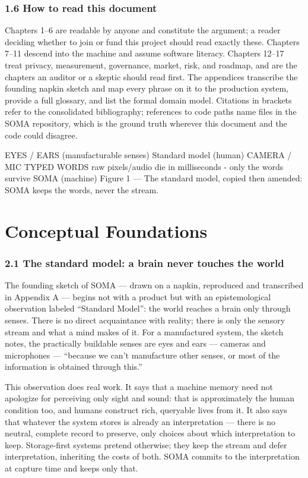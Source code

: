 \subsection{1.6 How to read this document}\label{how-to-read-this-document}

Chapters 1--6 are readable by anyone and constitute the argument; a reader deciding whether to join or fund this project should read exactly these. Chapters 7--11 descend into the machine and assume software literacy. Chapters 12--17 treat privacy, measurement, governance, market, risk, and roadmap, and are the chapters an auditor or a skeptic should read first. The appendices transcribe the founding napkin sketch and map every phrase on it to the production system, provide a full glossary, and list the formal domain model. Citations in brackets refer to the consolidated bibliography; references to code paths name files in the SOMA repository, which is the ground truth wherever this document and the code could disagree.

EYES / EARS (manufacturable senses) Standard model (human) CAMERA / MIC TYPED WORDS raw pixels/audio die in milliseconds - only the words survive SOMA (machine) Figure 1 --- The standard model, copied then amended: SOMA keeps the words, never the stream.

\chapter{Conceptual Foundations}\label{conceptual-foundations}

\subsection{2.1 The standard model: a brain never touches the world}\label{the-standard-model-a-brain-never-touches-the-world}

The founding sketch of SOMA --- drawn on a napkin, reproduced and transcribed in Appendix A --- begins not with a product but with an epistemological observation labeled ``Standard Model'': the world reaches a brain only through senses. There is no direct acquaintance with reality; there is only the sensory stream and what a mind makes of it. For a manufactured system, the sketch notes, the practically buildable senses are eyes and ears --- cameras and microphones --- ``because we can't manufacture other senses, or most of the information is obtained through this.''

This observation does real work. It says that a machine memory need not apologize for perceiving only sight and sound: that is approximately the human condition too, and humans construct rich, queryable lives from it. It also says that whatever the system stores is already an interpretation --- there is no neutral, complete record to preserve, only choices about which interpretation to keep. Storage-first systems pretend otherwise; they keep the stream and defer interpretation, inheriting the costs of both. SOMA commits to the interpretation at capture time and keeps only that.

